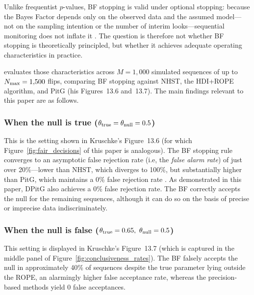 Unlike frequentist $p$-values, BF stopping is valid under optional stopping: because
the Bayes Factor depends only on the observed data and the assumed model---not on the
sampling intention or the number of interim looks---sequential monitoring does not
inflate it \citep{rouder2014}.
The question is therefore not whether BF stopping is theoretically principled, but
whether it achieves adequate operating characteristics in practice.

\citet{kruschke2015doing} evaluates those characteristics across $M=1{,}000$ simulated
sequences of up to $N_{\rm max}=1{,}500$ flips, comparing BF stopping against NHST,
the HDI+ROPE algorithm, and PitG (his Figures~13.6 and~13.7).
The main findings relevant to this paper are as follows.

\subsubsection*{When the null is true ($\theta_{\rm true}=\theta_{\rm null}=0.5$)}

This is the setting shown in Kruschke's Figure~13.6 (for which
Figure~\ref{fig:fair_decisions} of this paper is analogous).
The BF stopping rule converges to an asymptotic false rejection rate
(i.e, the \textit{false alarm rate})
of just over 20\%---lower than NHST, which diverges to 100\%, but substantially higher
than PitG, which maintains a 0\% false rejection rate \citep{kruschke2015doing}.
As demonstrated in this paper, DPitG also achieves a 0\% false rejection rate.
The BF correctly accepts the null for the remaining sequences, although it can do
so on the basis of precise or imprecise data indiscriminately.

\subsubsection*{When the null is false ($\theta_{\rm true}=0.65, \ \theta_{\rm null}=0.5$)}

This setting is displayed in Kruschke's Figure~13.7 (which is captured in the middle
panel of Figure~\ref{fig:conclusiveness_rates}).
The BF falsely accepts the null in approximately 40\% of sequences despite the true
parameter lying outside the ROPE, an alarmingly higher false acceptance rate,
whereas the precision-based methods yield 0 false acceptances.

